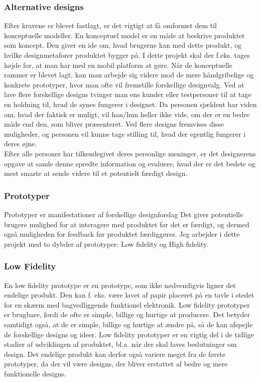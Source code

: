 \documentclass[a4paper,10pt,titlepage]{article}
\begin{document}
\subsubsection{Alternative designs}
Efter kravene er blevet fastlagt, er det vigtigt at få omformet dem til konceptuelle modeller. En konceptuel model er en måde at beskrive produktet som koncept. Den giver en ide om, hvad brugerne kan med dette produkt, og hvilke designmetaforer produktet bygger på. I dette projekt skal der f.eks. tages højde for, at man har med en mobil platform at gøre. Når de konceptuelle rammer er blevet lagt, kan man arbejde sig videre mod de mere håndgribelige og konkrete prototyper, hvor man ofte vil fremstille forskellige designvalg. Ved at lave flere forskellige designs tvinger man ens kunder eller testpersoner til at tage en holdning til, hvad de synes fungerer i designet. Da personen sjældent har viden om, hvad der faktisk er muligt, vil han/hun heller ikke vide, om der er en bedre måde end den, som bliver præsenteret. Ved flere designs fremvises disse muligheder, og personen vil kunne tage stilling til, hvad der egentlig fungerer i deres øjne.\\
Efter alle personer har tilkendegivet deres personlige meninger, er det designerens opgave at samle denne spredte information og evaluere, hvad der er det bedste og mest smarte at sende videre til et potentielt færdigt design.\parencite{Interaction}
\subsubsection{Prototyper}
Prototyper er manifestationer af forskellige designforslag Det giver potentielle brugere mulighed for at interagere med produktet før det er færdigt, og dermed også muligheden for feedback før produktet færdiggøres. Jeg arbejder i dette projekt med to dybder af prototyper: Low fidelity og High fidelity.
\subsubsection*{Low Fidelity}
En low fidelity prototype er en prototype, som ikke nødvendigvis ligner det endelige produkt. Den kan f. eks. være lavet af papir placeret på en tavle i stedet for en skærm med bagvedliggende funktionel elektronik.
Low fidelity prototyper er brugbare, fordi de ofte er simple, billige og hurtige at producere. Det betyder samtidigt også, at de er simple, billige og hurtige at ændre på, så de kan afspejle de forskellige designs og ideer. Low fidelity prototyper er en vigtig del i de tidlige stadier af udviklingen af produktet, bl.a. når der skal laves beslutninger om design. Det endelige produkt kan derfor også variere meget fra de første prototyper, da der vil være designs, der bliver erstattet af bedre og mere funktionelle designs.
\end{document}
